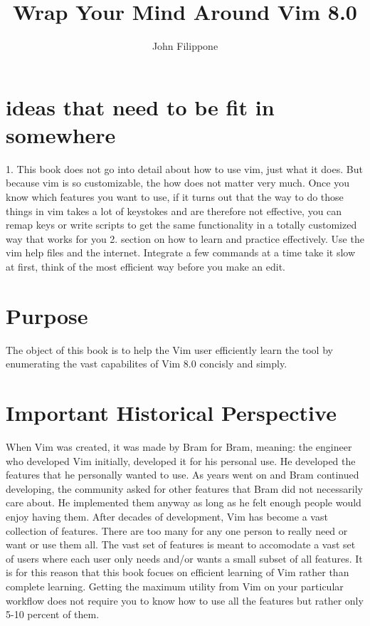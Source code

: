 \documentclass[12pt]{book}
\title{Wrap Your Mind Around Vim 8.0}
\author{John Filippone}
\begin{document}
\maketitle

\section{ideas that need to be fit in somewhere}
1. This book does not go into detail about how to use vim, just what it does.
But because vim is so customizable, the how does not matter very much.
Once you know which features you want to use, if it turns out that the way to do those things in vim takes a lot of keystokes and are therefore
not effective, you can remap keys or write scripts to get the same functionality in a totally customized way that works for you
2. section on how to learn and practice effectively.
Use the vim help files and the internet.
Integrate a few commands at a time take it slow at first, think of the most efficient way before you make an edit.

\section{Purpose}
The object of this book is to help the Vim user efficiently learn the tool by enumerating the vast capabilites of Vim 8.0 concisly and simply.

\section{Important Historical Perspective}
When Vim was created, it was made by Bram for Bram, meaning: the engineer who developed Vim initially, developed it for his personal use.
He developed the features that he personally wanted to use.
As years went on and Bram continued developing, the community asked for other features that Bram did not necessarily care about.
He implemented them anyway as long as he felt enough people would enjoy having them.
After decades of development, Vim has become a vast collection of features.
There are too many for any one person to really need or want or use them all.
The vast set of features is meant to accomodate a vast set of users where each user only needs and/or wants a small subset of all features.
It is for this reason that this book focues on efficient learning of Vim rather than complete learning.
Getting the maximum utility from Vim on your particular workflow does not require you to know how to use all the features but rather only 5-10 percent of them.
\end{document}
